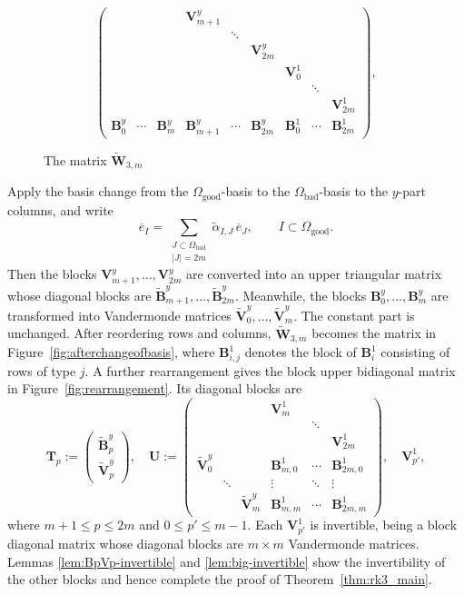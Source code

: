 \documentclass[12pt, letterpaper]{amsart}
\theoremstyle{definition}
\newcommand{\bB}{\mathbf{B} }
\newcommand{\bT}{\mathbf{T} }
\newcommand{\bU}{\mathbf{U} }
\newcommand{\bV}{\mathbf{V} }
\newcommand{\bW}{\mathbf{W} }
\newcommand{\Om}{\Omega}
\begin{document}
\begin{figure}[!ht]
\[
\begin{pmatrix}
  &&&\bV_{m+1}^{y}\\
  &&&&\ddots\\
  &&&&&\bV_{2m}^{y}\\
  &&&&&&\bV_{0}^{1}\\
  &&&&&&&\ddots\\
  &&&&&&&&\bV_{2m}^{1}\\
  \bB_{0}^{y}&\cdots&\bB_{m}^{y}&\bB_{m+1}^{y}&\cdots&\bB_{2m}^{y}&\bB_{0}^{1}&\cdots&\bB_{2m}^{1}
\end{pmatrix},
\]
\caption{The matrix \(\widetilde{\bW}_{3,m}\)} \label{fig:wholeW3m}
\end{figure}

Apply the basis change from the \(\Om_{\mathrm{good}}\)-basis to the \(\Om_{\mathrm{bad}}\)-basis to the \(y\)-part columns, and write
\[\overline e_I=\sum_{\substack{J\subset\Om_{\mathrm{bad}}\\|J|=2m}}\widetilde{\alpha}_{I,J}\,\overline e_J,\qquad I\subset\Om_{\mathrm{good}}.\]
Then the blocks \(\bV_{m+1}^y,\dots,\bV_{2m}^y\) are converted into an upper triangular matrix whose diagonal blocks are \(\widetilde{\bB}_{m+1}^y,\dots,\widetilde{\bB}_{2m}^y\). Meanwhile, the blocks \(\bB_0^y,\dots,\bB_m^y\) are transformed into Vandermonde matrices \(\widetilde{\bV}_0^y, \dots, \widetilde{\bV}_m^y\). The constant part is unchanged. After reordering rows and columns, \(\widetilde{\bW}_{3,m}\) becomes the matrix in Figure~\ref{fig:afterchangeofbasis}, where \(\bB_{i,j}^1\) denotes the block of \(\bB_i^1\) consisting of rows of type \(j\). A further rearrangement gives the block upper bidiagonal matrix in Figure~\ref{fig:rearrangement}. Its diagonal blocks are
\[
\bT_p := \begin{pmatrix} \widetilde{\bB}_{p}^y\\ \widetilde{\bV}_{p}^y \end{pmatrix}, \quad \bU := \begin{pmatrix}
  &&&\bV^1_m\\
  &&&&\ddots\\
  &&&&&\bV^1_{2m}\\
  \widetilde{\bV}^y_0&&&\bB^1_{m,0}&\cdots&\bB^1_{2m,0}\\
  &\ddots&&\vdots&\ddots&\vdots\\
  &&\widetilde{\bV}^y_m&\bB^1_{m,m}&\cdots&\bB^1_{2m,m}
\end{pmatrix}, \quad\bV^1_{p'},
\]
where \(m+1 \le p \le 2m\) and \(0 \le p' \le m-1\). Each \(\bV^1_{p'}\) is invertible, being a block diagonal matrix whose diagonal blocks are \(m\times m\) Vandermonde matrices. Lemmas \ref{lem:BpVp-invertible} and \ref{lem:big-invertible} show the invertibility of the other blocks and hence complete the proof of Theorem~\ref{thm:rk3_main}.
\end{document}
